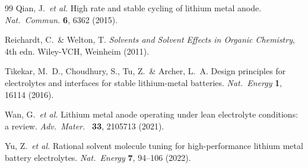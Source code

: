 \documentclass[11pt]{article}
\theoremstyle{plain}
\theoremstyle{definition}
\theoremstyle{remark}
\begin{document}
\begin{thebibliography}{99}
Qian, J.\ \textit{et al.}
High rate and stable cycling of lithium metal anode.
\textit{Nat.\ Commun.} \textbf{6}, 6362 (2015).

Reichardt, C.\ \& Welton, T.
\textit{Solvents and Solvent Effects in Organic Chemistry}, 4th edn.
Wiley-VCH, Weinheim (2011).

Tikekar, M.\ D., Choudhury, S., Tu, Z.\ \& Archer, L.\ A.
Design principles for electrolytes and interfaces for stable
lithium-metal batteries.
\textit{Nat.\ Energy} \textbf{1}, 16114 (2016).

Wan, G.\ \textit{et al.}
Lithium metal anode operating under lean electrolyte conditions:
a review.
\textit{Adv.\ Mater.\ } \textbf{33}, 2105713 (2021).

Yu, Z.\ \textit{et al.}
Rational solvent molecule tuning for high-performance lithium metal
battery electrolytes.
\textit{Nat.\ Energy} \textbf{7}, 94--106 (2022).

\end{thebibliography}
\end{document}
